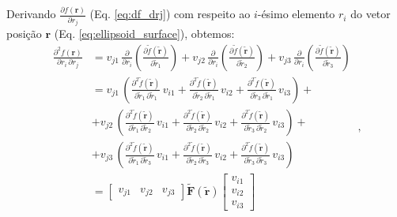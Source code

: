 Derivando $\frac{\partial f(\mathbf{r})}{\partial r_{j}}$
(Eq. \ref{eq:df_drj}) com respeito ao $i$-ésimo elemento 
$r_{i}$ do vetor posição $\mathbf{r}$ (Eq. \ref{eq:ellipsoid_surface}),
obtemos:
\begin{equation}
\begin{split}
\frac{\partial^{2} f(\mathbf{r})}{\partial r_{i} \, \partial r_{j}} &=
v_{j1} \, \frac{\partial}{\partial r_{i}} 
\left( \frac{\partial \tilde{f}(\tilde{\mathbf{r}})}{\partial \tilde{r}_{1}} \right) +
v_{j2} \, \frac{\partial}{\partial r_{i}} 
\left( \frac{\partial \tilde{f}(\tilde{\mathbf{r}})}{\partial \tilde{r}_{2}} \right) +
v_{j3} \, \frac{\partial}{\partial r_{i}} 
\left( \frac{\partial \tilde{f}(\tilde{\mathbf{r}})}{\partial \tilde{r}_{3}} \right) \\
&= v_{j1} \, \left( 
\frac{\partial^{2} \tilde{f}(\tilde{\mathbf{r}})}
{\partial \tilde{r}_{1} \, \partial \tilde{r}_{1}} \, v_{i1} + 
\frac{\partial^{2} \tilde{f}(\tilde{\mathbf{r}})}
{\partial \tilde{r}_{2} \, \partial \tilde{r}_{1}} \, v_{i2} + 
\frac{\partial^{2} \tilde{f}(\tilde{\mathbf{r}})}
{\partial \tilde{r}_{3} \, \partial \tilde{r}_{1}} \, v_{i3} 
\right) + \\
&+ v_{j2} \, \left( 
\frac{\partial^{2} \tilde{f}(\tilde{\mathbf{r}})}
{\partial \tilde{r}_{1} \, \partial \tilde{r}_{2}} \, v_{i1} + 
\frac{\partial^{2} \tilde{f}(\tilde{\mathbf{r}})}
{\partial \tilde{r}_{2} \, \partial \tilde{r}_{2}} \, v_{i2} + 
\frac{\partial^{2} \tilde{f}(\tilde{\mathbf{r}})}
{\partial \tilde{r}_{3} \, \partial \tilde{r}_{2}} \, v_{i3} 
\right) + \\
&+ v_{j3} \, \left( 
\frac{\partial^{2} \tilde{f}(\tilde{\mathbf{r}})}
{\partial \tilde{r}_{1} \, \partial \tilde{r}_{3}} \, v_{i1} + 
\frac{\partial^{2} \tilde{f}(\tilde{\mathbf{r}})}
{\partial \tilde{r}_{2} \, \partial \tilde{r}_{3}} \, v_{i2} + 
\frac{\partial^{2} \tilde{f}(\tilde{\mathbf{r}})}
{\partial \tilde{r}_{3} \, \partial \tilde{r}_{3}} \, v_{i3} 
\right) \\
&= \left[ \begin{array}{ccc}
v_{j1} & v_{j2} & v_{j3}
\end{array} \right] \tilde{\mathbf{F}}(\tilde{\mathbf{r}})
\left[ \begin{array}{c}
v_{i1} \\ v_{i2} \\ v_{i3}
\end{array} \right]
\end{split} \: ,
\label{eq:d2f-dridrj}
\end{equation}
